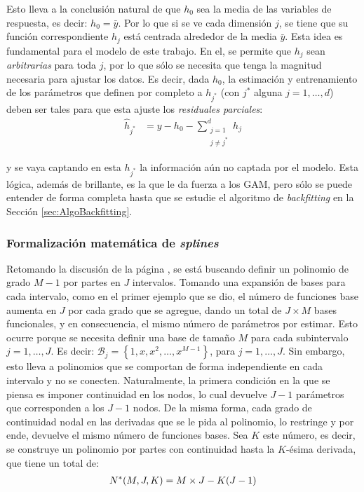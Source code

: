\documentclass[../Main/Main.tex]{subfiles}
\begin{document}
Esto lleva a la conclusión natural de que $h_0$ sea la media de las variables de respuesta, es decir: $h_0 = \bar{y}$. Por lo que si se ve cada dimensión $j$, se tiene que su función correspondiente $h_j$ está centrada alrededor de la media $\bar{y}$. Esta idea es fundamental para el modelo de este trabajo. En el, se permite que $h_j$ sean \textit{arbitrarias} para toda $j$, por lo que sólo se necesita que tenga la magnitud necesaria para ajustar los datos. Es decir, dada $h_0$, la estimación y entrenamiento de los parámetros que definen por completo a $h_{j^*}$ (con $j^*$ alguna $j=1,\ldots,d$) deben ser tales para que esta ajuste los \textit{residuales parciales}:
\begin{align}
\hat{h}_{j^*} &= y - h_0 - \sum_{\substack{j=1\\ j \neq j^*}}^d h_j \label{ec:ResParciales}
\end{align}

y se vaya captando en esta $h_{j^*}$ la información aún no captada por el modelo. Esta lógica, además de brillante, es la que le da fuerza a los GAM, pero sólo se puede entender de forma completa hasta que se estudie el algoritmo de \textit{backfitting} en la Sección \ref{sec:AlgoBackfitting}. 

\subsubsection{Formalización matemática de \textit{splines}}
Retomando la discusión de la página \pageref{sec:PolisYSplines}, se está buscando definir un polinomio de grado $M-1$ por partes en $J$ intervalos. Tomando una expansión de bases para cada intervalo, como en el primer ejemplo que se dio, el número de funciones base aumenta en $J$ por cada grado que se agregue, dando un total de $J\times  M$ bases funcionales, y en consecuencia, el mismo número de parámetros por estimar. Esto ocurre porque se necesita definir una base de tamaño $M$ para cada subintervalo $j = 1,\ldots,J$. Es decir: $\mathcal{B}_j = \left\{1,x,x^2,\ldots,x^{M-1}\right\}$, para $j = 1,\ldots,J$. Sin embargo, esto lleva a polinomios que se comportan de forma independiente en cada intervalo y no se conecten. Naturalmente, la primera condición en la que se piensa es imponer continuidad en los nodos, lo cual devuelve $J-1$ parámetros que corresponden a los $J-1$ nodos. De la misma forma, cada grado de continuidad nodal en las derivadas que se le pida al polinomio, lo restringe y por ende, devuelve el mismo número de funciones bases. Sea $K$ este número, es decir, se construye un polinomio por partes con continuidad hasta la $K$-ésima derivada, que tiene un total de:
\begin{align}
	N^*(M,J,K) = M\times J - K(J-1) \label{ec:NEstrella}
\end{align}
\end{document}
